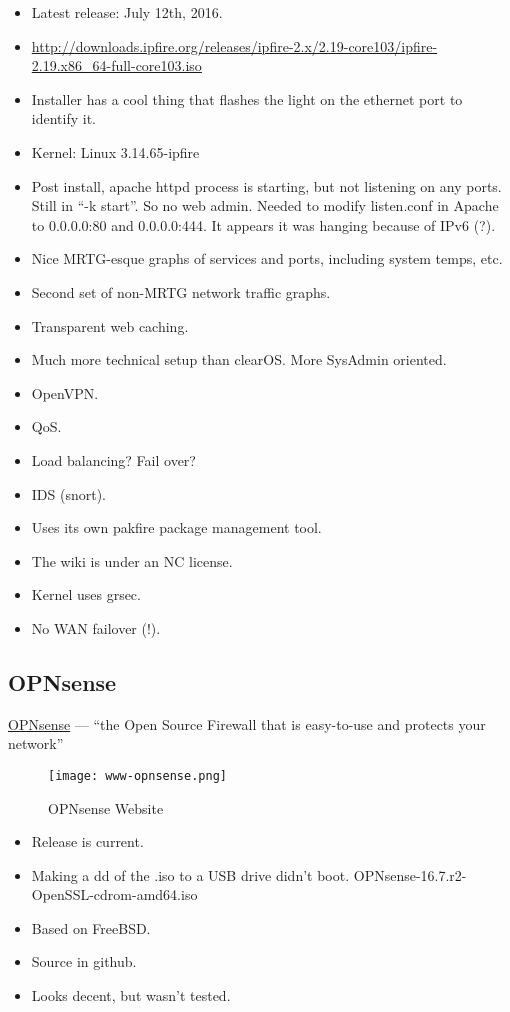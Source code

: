 \begin{itemize}
 \item Latest release: July 12th, 2016.
 \item \url{http://downloads.ipfire.org/releases/ipfire-2.x/2.19-core103/ipfire-2.19.x86_64-full-core103.iso}
 \item Installer has a cool thing that flashes the light on the ethernet port to identify it.
 \item Kernel: Linux 3.14.65-ipfire
 \item Post install, apache httpd process is starting, but not listening on any ports. Still in ``-k start''. So no web admin. Needed to modify listen.conf in Apache to 0.0.0.0:80 and 0.0.0.0:444. It appears it was hanging because of IPv6 (?).
 \item Nice MRTG-esque graphs of services and ports, including system temps, etc.
 \item Second set of non-MRTG network traffic graphs.
 \item Transparent web caching.
 \item Much more technical setup than clearOS. More SysAdmin oriented.
 \item OpenVPN.
 \item QoS.
 \item Load balancing? Fail over?
 \item IDS (snort).
 \item Uses its own pakfire package management tool.
 \item The wiki is under an NC license.
 \item Kernel uses grsec.
 \item No WAN failover (!).
\end{itemize}


\subsection{OPNsense}
 \href{https://opnsense.org/}{OPNsense} --- ``the Open Source Firewall that is easy-to-use and protects your network''

\begin{figure}[h!]
\texttt{[image: www-opnsense.png]}
 \caption{OPNsense Website}
 \label{fig:www-opnsense}
\end{figure}

\begin{itemize}
 \item Release is current.
 \item Making a dd of the .iso to a USB drive didn't boot. OPNsense-16.7.r2-OpenSSL-cdrom-amd64.iso
 \item Based on FreeBSD.
 \item Source in github.
 \item Looks decent, but wasn't tested.
\end{itemize}


